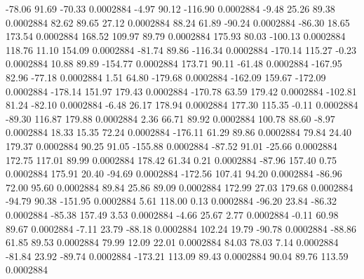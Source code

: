       -78.06       91.69      -70.33     0.0002884
       -4.97       90.12     -116.90     0.0002884
       -9.48       25.26       89.38     0.0002884
       82.62       89.65       27.12     0.0002884
       88.24       61.89      -90.24     0.0002884
      -86.30       18.65      173.54     0.0002884
      168.52      109.97       89.79     0.0002884
      175.93       80.03     -100.13     0.0002884
      118.76       11.10      154.09     0.0002884
      -81.74       89.86     -116.34     0.0002884
     -170.14      115.27       -0.23     0.0002884
       10.88       89.89     -154.77     0.0002884
      173.71       90.11      -61.48     0.0002884
     -167.95       82.96      -77.18     0.0002884
        1.51       64.80     -179.68     0.0002884
     -162.09      159.67     -172.09     0.0002884
     -178.14      151.97      179.43     0.0002884
     -170.78       63.59      179.42     0.0002884
     -102.81       81.24      -82.10     0.0002884
       -6.48       26.17      178.94     0.0002884
      177.30      115.35       -0.11     0.0002884
      -89.30      116.87      179.88     0.0002884
        2.36       66.71       89.92     0.0002884
      100.78       88.60       -8.97     0.0002884
       18.33       15.35       72.24     0.0002884
     -176.11       61.29       89.86     0.0002884
       79.84       24.40      179.37     0.0002884
       90.25       91.05     -155.88     0.0002884
      -87.52       91.01      -25.66     0.0002884
      172.75      117.01       89.99     0.0002884
      178.42       61.34        0.21     0.0002884
      -87.96      157.40        0.75     0.0002884
      175.91       20.40      -94.69     0.0002884
     -172.56      107.41       94.20     0.0002884
      -86.96       72.00       95.60     0.0002884
       89.84       25.86       89.09     0.0002884
      172.99       27.03      179.68     0.0002884
      -94.79       90.38     -151.95     0.0002884
        5.61      118.00        0.13     0.0002884
      -96.20       23.84      -86.32     0.0002884
      -85.38      157.49        3.53     0.0002884
       -4.66       25.67        2.77     0.0002884
       -0.11       60.98       89.67     0.0002884
       -7.11       23.79      -88.18     0.0002884
      102.24       19.79      -90.78     0.0002884
      -88.86       61.85       89.53     0.0002884
       79.99       12.09       22.01     0.0002884
       84.03       78.03        7.14     0.0002884
      -81.84       23.92      -89.74     0.0002884
     -173.21      113.09       89.43     0.0002884
       90.04       89.76      113.59     0.0002884
